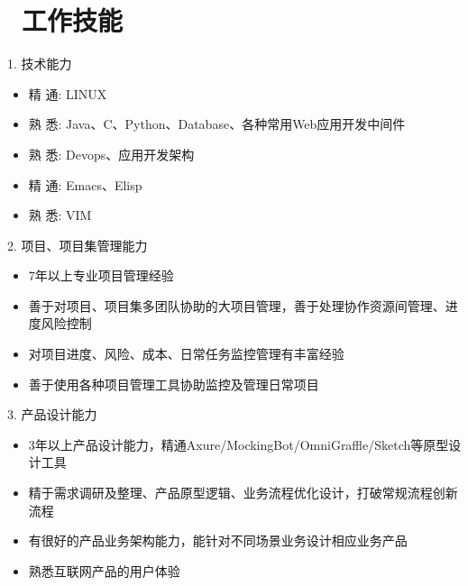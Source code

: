 \documentclass{resume}
\begin{document}

\section{\faCogs\ 工作技能}
1. 技术能力
\begin{itemize}[parsep=0.5ex]
    \item  精 通: LINUX
    \item  熟 悉: Java、C、Python、Database、各种常用Web应用开发中间件
    \item  熟 悉: Devops、应用开发架构
    \item  精 通: Emacs、Elisp
    \item  熟 悉: VIM
  \end{itemize}
    
2. 项目、项目集管理能力
\begin{itemize}[parsep=0.5ex]
    \item 7年以上专业项目管理经验
    \item 善于对项目、项目集多团队协助的大项目管理，善于处理协作资源间管理、进度风险控制
    \item 对项目进度、风险、成本、日常任务监控管理有丰富经验
    \item 善于使用各种项目管理工具协助监控及管理日常项目
  \end{itemize}
3. 产品设计能力 
\begin{itemize}[parsep=0.5ex]
    \item 3年以上产品设计能力，精通Axure/MockingBot/OmniGraffle/Sketch等原型设计工具
    \item 精于需求调研及整理、产品原型逻辑、业务流程优化设计，打破常规流程创新流程
    \item 有很好的产品业务架构能力，能针对不同场景业务设计相应业务产品
    \item 熟悉互联网产品的用户体验
  \end{itemize}

    
\end{document}
